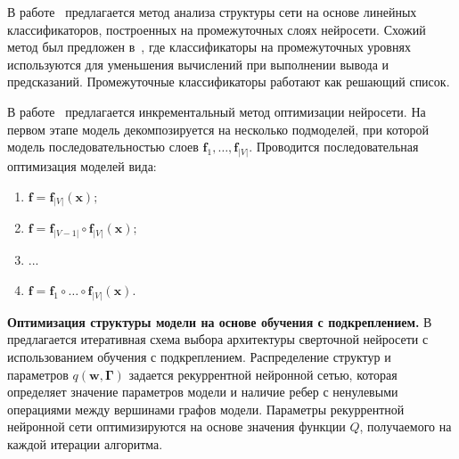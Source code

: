  
 
В работе~\cite{layer_probe} предлагается метод анализа структуры сети на основе линейных классификаторов, построенных на промежуточных слоях нейросети.
Схожий метод был предложен в~\cite{branches}, где классификаторы на промежуточных уровнях используются для уменьшения вычислений при выполнении вывода и предсказаний.
Промежуточные классификаторы работают как решающий список.

В работе~\cite{nn_inc} предлагается инкрементальный метод оптимизации нейросети. На первом этапе модель декомпозируется на несколько подмоделей, при которой модель последовательностью слоев $\mathbf{f}_1,\dots,\mathbf{f}_{|V|}$. Проводится последовательная оптимизация моделей вида:
\begin{enumerate}[1)]
\item $\mathbf{f} = \mathbf{f}_{|V|} (\mathbf{x});$
\item $\mathbf{f} = \mathbf{f}_{|V-1|} \circ \mathbf{f}_{|V|} (\mathbf{x});$
\item ...
\item $\mathbf{f} = \mathbf{f}_{1} \circ \dots \circ \mathbf{f}_{|V|} (\mathbf{x}).$
\end{enumerate}




\par{\textbf{Оптимизация структуры модели на основе обучения с подкреплением. }}
В~\cite{reinf} предлагается итеративная схема выбора архитектуры сверточной нейросети с использованием обучения с подкреплением. Распределение структур и параметров $q(\mathbf{w}, \boldsymbol{\Gamma})$ задается рекуррентной нейронной сетью, которая определяет значение параметров модели и наличие ребер с ненулевыми операциями между вершинами графов модели. Параметры рекуррентной нейронной сети оптимизируются на основе значения функции $Q$, получаемого на каждой итерации алгоритма.


